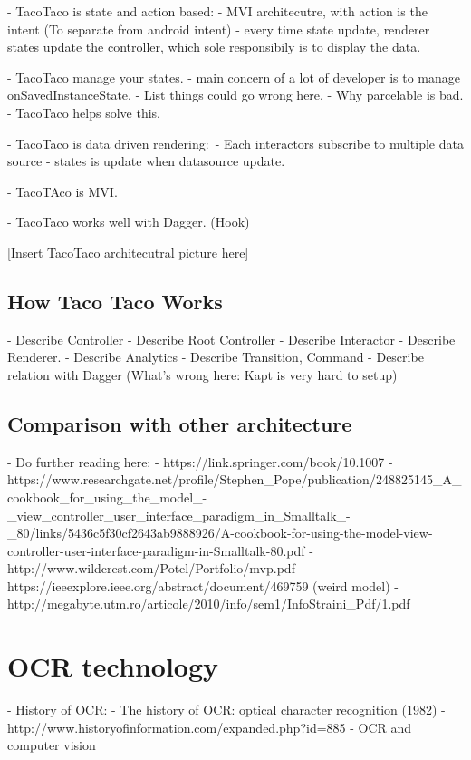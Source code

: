 - TacoTaco is state and action based:
    - MVI architecutre, with action is the intent (To separate from android intent)
    - every time state update, renderer states update the controller, which sole responsibily is to display the data.
    
- TacoTaco manage your states.
    - main concern of a lot of developer is to manage onSavedInstanceState.
        - List things could go wrong here.
        - Why parcelable is bad.
    - TacoTaco helps solve this.

- TacoTaco is data driven rendering:\
    - Each interactors subscribe to multiple data source
    - states is update when datasource update.
    
- TacoTAco is MVI.

- TacoTaco works well with Dagger. (Hook)

[Insert TacoTaco architecutral picture here]

\subsection{How Taco Taco Works}

- Describe Controller
- Describe Root Controller
- Describe Interactor
- Describe Renderer.
- Describe Analytics
- Describe Transition, Command
- Describe relation with Dagger (What's wrong here: Kapt is very hard to setup)

\subsection{Comparison with other architecture}

- Do further reading here: 
    - https://link.springer.com/book/10.1007%
    - https://www.researchgate.net/profile/Stephen_Pope/publication/248825145_A_cookbook_for_using_the_model_-_view_controller_user_interface_paradigm_in_Smalltalk_-_80/links/5436c5f30cf2643ab9888926/A-cookbook-for-using-the-model-view-controller-user-interface-paradigm-in-Smalltalk-80.pdf
    - http://www.wildcrest.com/Potel/Portfolio/mvp.pdf
    - https://ieeexplore.ieee.org/abstract/document/469759 (weird model)
    - http://megabyte.utm.ro/articole/2010/info/sem1/InfoStraini_Pdf/1.pdf
    
\section{OCR technology}

- History of OCR:
    - The history of OCR: optical character recognition (1982)
    - http://www.historyofinformation.com/expanded.php?id=885
    - OCR and computer vision


